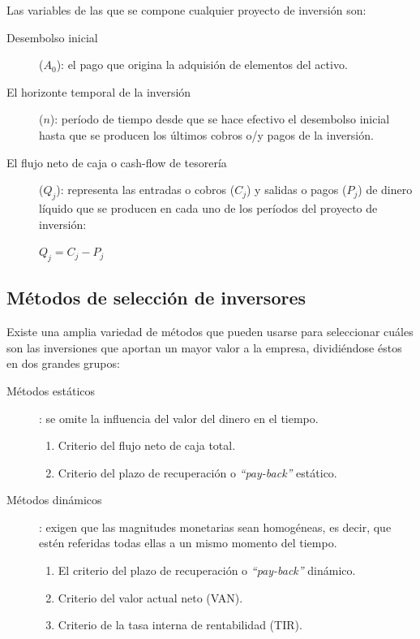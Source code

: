 \documentclass[10pt,a4paper,spanish]{report}
\begin{document}
            Las variables de las que se compone cualquier proyecto de inversión son:
            \begin{description}
                  \item[Desembolso inicial] ($A_{0}$): el pago que origina la adquisión de elementos del activo.
                  \item[El horizonte temporal de la inversión] ($n$): período de tiempo desde que se hace efectivo el desembolso inicial hasta que se producen los últimos cobros o/y pagos de la inversión.
                  \item[El flujo neto de caja o cash-flow de tesorería] ($Q_{j}$): representa las entradas o cobros ($C_{j}$) y salidas o pagos ($P_{j}$) de dinero líquido que se producen en cada uno de los períodos del proyecto de inversión:
                  \begin{center} 
                        $Q_{j} = C_{j} - P_{j}$ 
                  \end{center}
            \end{description}

      \subsection{\textcolor[rgb]{0.4,0.7,0.4}Métodos de selección de inversores}

            Existe una amplia variedad de métodos que pueden usarse para seleccionar cuáles son las inversiones que aportan un mayor valor a la empresa, dividiéndose éstos en dos grandes grupos:
            \begin{description}
                  \item[Métodos estáticos]: se omite la influencia del valor del dinero en el tiempo.
                        \begin{enumerate}
                              \item Criterio del flujo neto de caja total.
                              \item Criterio del plazo de recuperación o \textit{\textcolor[rgb]{0.4,0.7,0.4}{``pay-back''}} estático.
                        \end{enumerate}
                  \item[Métodos dinámicos]: exigen que las magnitudes monetarias sean homogéneas, es decir, que estén referidas todas ellas a un mismo momento del tiempo.
                        \begin{enumerate}
                              \item El criterio del plazo de recuperación o \textit{\textcolor[rgb]{0.4,0.7,0.4}{``pay-back''}} dinámico.
                              \item Criterio del valor actual neto (VAN).
                              \item Criterio de la tasa interna de rentabilidad (TIR).
                        \end{enumerate}
            \end{description}
\end{document}
